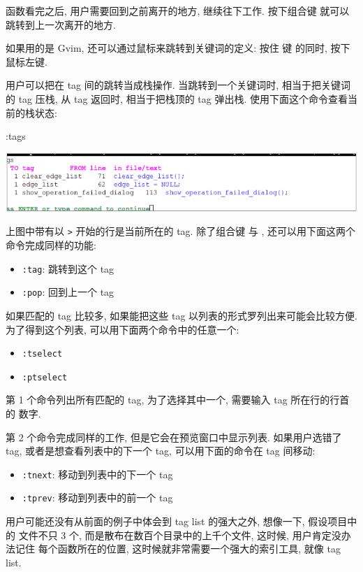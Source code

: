 函数看完之后, 用户需要回到之前离开的地方, 继续往下工作. 按下组合键
 就可以跳转到上一次离开的地方.

\begin{warning}
    如果用的是 Gvim, 还可以通过鼠标来跳转到关键词的定义: 按住  键
    的同时, 按下鼠标左键.
\end{warning}
用户可以把在 tag 间的跳转当成栈操作. 当跳转到一个关键词时, 相当于把关键词的 tag 
压栈, 从 tag 返回时, 相当于把栈顶的 tag 弹出栈.
使用下面这个命令查看当前的栈状态:
\begin{vimcode}
:tags
\end{vimcode}
\begin{center}
    \includegraphics[scale=0.7]{./images/page82.png}
\end{center}
上图中带有以 \texttt{>} 开始的行是当前所在的 tag. 除了组合键 \key{Ctrl+]}
与 , 还可以用下面这两个命令完成同样的功能:
\begin{itemize}
    \item \texttt{:tag}: 跳转到这个 tag
    \item \texttt{:pop}: 回到上一个 tag
\end{itemize}

如果匹配的 tag 比较多, 如果能把这些 tag 以列表的形式罗列出来可能会比较方便.
为了得到这个列表, 可以用下面两个命令中的任意一个:
\begin{itemize}
    \item \texttt{:tselect}
    \item \texttt{:ptselect}
\end{itemize}
第 1 个命令列出所有匹配的 tag, 为了选择其中一个, 需要输入 tag 所在行的行首的
数字.

第 2 个命令完成同样的工作, 但是它会在预览窗口中显示列表. 如果用户选错了 tag,
或者是想查看列表中的下一个 tag, 可以用下面的命令在 tag 间移动:
\begin{itemize}
    \item \texttt{:tnext}: 移动到列表中的下一个 tag
    \item \texttt{:tprev}: 移动到列表中的前一个 tag
\end{itemize}

用户可能还没有从前面的例子中体会到 tag list 的强大之外, 想像一下, 假设项目中的
文件不只 3 个, 而是散布在数百个目录中的上千个文件, 这时候, 用户肯定没办法记住
每个函数所在的位置, 这时候就非常需要一个强大的索引工具, 就像 tag list.

